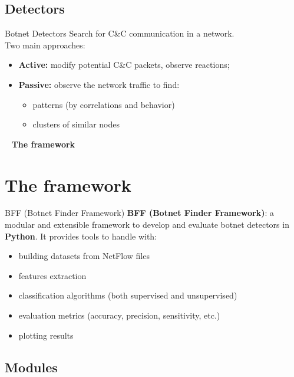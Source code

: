 \documentclass{beamer}
\begin{document}
	\subsection{Detectors}
	
	\begin{frame}{Botnet Detectors}
		Search for C\&C communication in a network.\\
		Two main approaches:
		\begin{itemize}
			\item \textbf{Active:} modify potential C\&C packets, observe reactions;
			\item \textbf{Passive:} observe the network traffic to find:
			\begin{itemize}
				\item patterns (by correlations and behavior)
				\item clusters of similar nodes
			\end{itemize}
		\end{itemize}
	\end{frame}
	
	\begin{frame}{\ }
		\Huge \textbf{The framework}
	\end{frame}
	
	\section{The framework}
	
	\begin{frame}{BFF (Botnet Finder Framework)}
		\textbf{BFF (Botnet Finder Framework)}: a modular and extensible framework to develop and evaluate botnet detectors in \textbf{Python}. It provides tools to handle with:
		\begin{itemize}
			\item building datasets from NetFlow files
			\item features extraction
			\item classification algorithms (both supervised and unsupervised)
			\item evaluation metrics (accuracy, precision, sensitivity, etc.)
			\item plotting results
		\end{itemize}
	\end{frame}
	
	\subsection{Modules}
\end{document}
